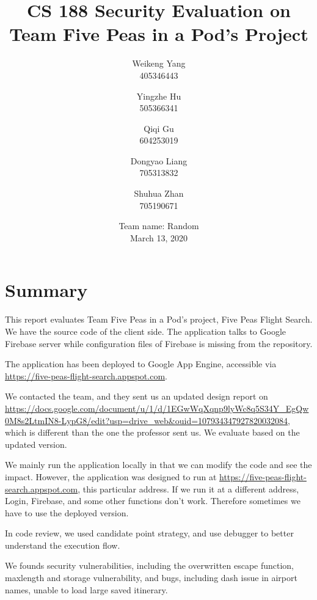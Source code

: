 \documentclass[12pt, a4paper]{article}
\title{CS 188 Security Evaluation on Team Five Peas in a Pod's Project}
\author{Weikeng Yang\\405346443 \and
Yingzhe Hu\\505366341 \and
Qiqi Gu\\604253019 \and
Dongyao Liang\\705313832 \and
Shuhua Zhan\\705190671}
\date{Team name: Random\\[2mm]March 13, 2020}
\newcommand{\code}[1]{\texttt{#1}}
\begin{document}
\maketitle

\tableofcontents
\newpage

\newcommand{\theproject}{Five Peas Flight Search}
\section{Summary}
This report evaluates Team Five Peas in a Pod's project, Five Peas Flight Search. We have the source code of the client side. The application talks to Google Firebase server while configuration files of Firebase is missing from the repository. %

The application has been deployed to Google App Engine, accessible via \url{https://five-peas-flight-search.appspot.com}. 

We contacted the team, and they sent us an updated design report on \url{https://docs.google.com/document/u/1/d/1EGwWqXqnp9lyWc8q5S34Y_EgQw0M8s2LtmIN8-LypG8/edit?usp=drive_web&ouid=107934347927820032084}, which is different than the one the professor sent us. We evaluate based on the updated version.

We mainly run the application locally in that we can modify the code and see the impact. However, the application was designed to run at \url{https://five-peas-flight-search.appspot.com}, this particular address. If we run it at a different address, Login, Firebase, and some other functions don't work. Therefore sometimes we have to use the deployed version.


In code review, we used candidate point strategy, and use debugger to better understand the execution flow. 

We founds security vulnerabilities, including the overwritten escape function, maxlength and storage vulnerability, and bugs, including dash issue in airport names, unable to load large saved itinerary.
\end{document}
